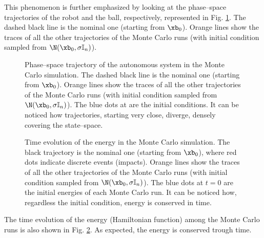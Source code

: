 This phenomenon is further emphasized by looking at the phase--space trajectories of the robot and the ball, respectively, represented in Fig. \ref{fig:chaos2}. The dashed black line is the nominal one (starting from $\xb_0$). Orange lines show the traces of all the other trajectories of the Monte Carlo runs (with initial condition sampled from $\N(\xb_0,\sigma\mathbb{I}_n)$). 
%
\begin{figure}[!ht]
    \centering
    \caption[Phase--space trajectory of the autonomous system in the Monte Carlo simulation]{Phase--space trajectory of the autonomous system in the Monte Carlo simulation. The dashed black line is the nominal one (starting from $\xb_0$). Orange lines show the traces of all the other trajectories of the Monte Carlo runs (with initial condition sampled from $\N(\xb_0,\sigma\mathbb{I}_n)$). The blue dots at are the initial conditions. It can be noticed how trajectories, starting very close, diverge, densely covering the state--space.}
    \label{fig:chaos2}
\end{figure}
%
\begin{figure}[!ht]
    \centering
    \caption[Time evolution of the energy in the Monte Carlo simulation]{Time evolution of the energy in the Monte Carlo simulation. The black trajectory is the nominal one (starting from $\xb_0$), where red dots indicate discrete events (impacts). Orange lines show the traces of all the other trajectories of the Monte Carlo runs (with initial condition sampled from $\N(\xb_0,\sigma\mathbb{I}_n)$). The blue dots at $t=0$ are the initial energies of each Monte Carlo run. It can be noticed how, regardless the initial condition, energy is conserved in time.}
    \label{fig:chaos3}
\end{figure}

The time evolution of the energy (Hamiltonian function) among the Monte Carlo runs is also shown in Fig. \ref{fig:chaos3}. As expected, the energy is conserved trough time.
%


